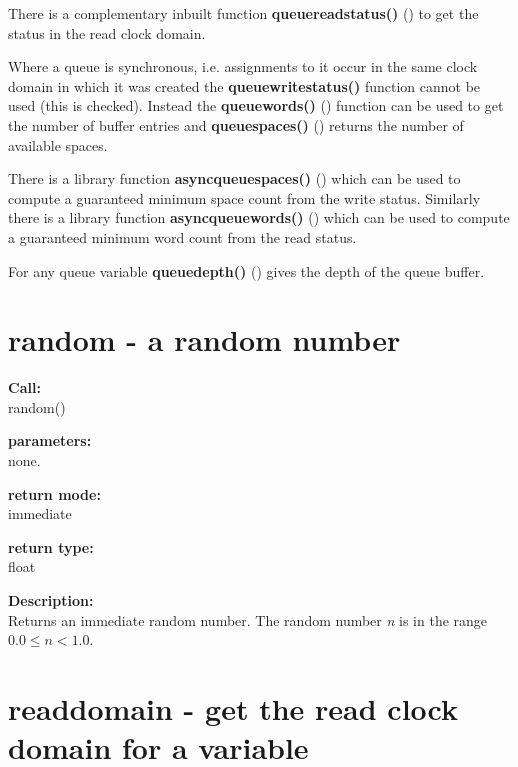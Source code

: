         There is a complementary inbuilt function {\bf queuereadstatus()}
        () to get the status in the read
        clock domain.

        Where a queue is synchronous, i.e. assignments to it occur in the same
        clock domain in which it was created the {\bf queuewritestatus()}
        function cannot be used (this is checked). Instead the {\bf
        queuewords()} () function can be used to get the number
        of buffer entries and {\bf queuespaces()} ()
        returns the number of available spaces.
        
        There is a library function {\bf asyncqueuespaces()}
        () which can be used to compute
        a guaranteed minimum space count from the write status.
        Similarly there is a library function {\bf asyncqueuewords()}
        () which can be used to compute
        a guaranteed minimum word count from the read status.

        For any queue variable {\bf queuedepth()} () gives
        the depth of the queue buffer.



    \section{random - a random number}\label{sec:ifrandom}
            
        {\bf Call:} \\
        random()
        
        {\bf parameters:} \\
        none.
        
        {\bf return mode:} \\
        immediate

        {\bf return type:} \\
        float
        
        {\bf Description:} \\
        Returns an immediate random number. The random number {\em n} is in
        the range $0.0 \le n < 1.0$.


    \section{readdomain - get the read clock domain for a variable}\label{sec:ifreaddomain}
        
